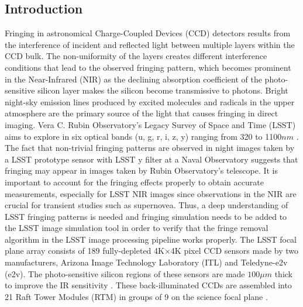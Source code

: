 \documentclass[twocolumn]{aastex63} %
\begin{document}
\begin{CJK*}{UTF8}{gbsn}

\section{Introduction}
Fringing in astronomical Charge-Coupled Devices (CCD) detectors results from the interference of incident and reflected light between multiple layers within the CCD bulk. The non-uniformity of the layers creates different interference conditions that lead to the observed fringing pattern, which becomes prominent in the Near-Infrared (NIR) as the declining absorption coefficient of the photo-sensitive silicon layer makes the silicon become transmissive to photons. Bright night-sky emission lines produced by excited molecules and radicals in the upper atmosphere are the primary source of the light that causes fringing in direct imaging. Vera C. Rubin Observatory's Legacy Survey of Space and Time (LSST) aims to explore in six optical bands (u, g, r, i, z, y) ranging from 320 to 1100$nm$ \citep{LSST09}. The fact that non-trivial fringing patterns are observed in night images taken by a LSST prototype sensor with LSST y filter at a Naval Observatory \citep{Brooks17} suggests that fringing may appear in images taken by Rubin Observatory's telescope. It is important to account for the fringing effects properly to obtain accurate measurements, especially for LSST NIR images since observations in the NIR are crucial for transient studies such as supernovea. Thus, a deep understanding of LSST fringing patterns is needed and fringing simulation needs to be added to the LSST image simulation tool \citep{LSST21} in order to verify that the fringe removal algorithm in the LSST image processing pipeline works properly. The LSST focal plane array consists of 189 fully-depleted 4K$\times$4K  pixel CCD sensors made by two manufacturers, Arizona Image Technology Laboratory (ITL) and Teledyne-e2v (e2v). The photo-sensitive silicon regions of these sensors are made $100\mu m$ thick to improve the IR sensitivity \citep{Connor19}. These back-illuminated CCDs are assembled into 21  Raft Tower Modules (RTM) in groups of 9 on the science focal plane \citep{Connor16}. 


\end{CJK*}
\end{document}
